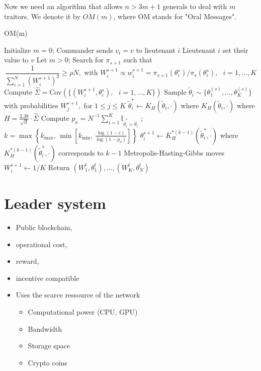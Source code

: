 Now we need an algorithm that allows $n>3m+1$ generals to deal with $m$ traitors. We denote it by $OM(m)$, where OM stands for "Oral Messages".
\begin{algorithm}[!ht]
\caption{OM(m) }\label{alg:om}
\begin{algorithmic}[1]
\State Initialize $m=0$;
\State Commander sends $v_i = v$ to lieutenant $i$ 
\State Lieutenant $i$ set their value to $v$
\EndFor
\State Let $m>0$;
\State Search for $\pi_{s+1}$ such that
\[
\frac{1}{\sum_{i=1}^{N}(W_i^{s+1})^2}\geq \rho N,\text{ with }W_i^{s+1}\propto w_i^{s+1} = \pi_{s+1}(\theta^{s}_i)/\pi_{s}(\theta^{s}_i) ,\text{ }i = 1,\ldots, K
\]
\State Compute $\widehat{\Sigma} = \text{Cov}\left(\{ (W_i^{s+1}, \theta_i^{s}),\text{ }i = 1,\ldots, K\}\right)$
\State Sample $\tilde{\theta}_i\sim\{\theta^{(s)}_1,\ldots, \theta^{(s)}_K\}$ with probabilities $W_j^{s+1},\text{ for }1\leq j\leq K$
\EndFor 
{}
\State $\tilde{\theta}^\ast_i\leftarrow K_H(\tilde{\theta}_i,\cdot)$ where $K_H(\tilde{\theta}_i,\cdot)$ where $H = \frac{2.38}{\sqrt{d}}\cdot \widehat{\Sigma}$ 
\EndFor 
\State Compute $p_a = N^{-1}\sum_{i = 1}^K\mathbb{I}_{\tilde{\theta}^\ast_i=\tilde{\theta}_i}$ ; $k = \max\left\{k_{\text{max}},\, \min\left[k_{\text{min}},\,\frac{\log(1-c)}{\log(1-p_a)}\right]\right\}$
\State $\theta^{s+1}_i\leftarrow K_H^{\ast (k-1)}(\tilde{\theta}^\ast_i,\cdot)$ where $K_H^{\ast (k-1)}(\tilde{\theta}^\ast_i,\cdot)$ corresponds to $k-1$ Metropolis-Hasting-Gibbs moves
\State $W_i^{s+1}\leftarrow 1/K$
\EndFor
\EndWhile
\State Return $(W^{t}_1,\theta^{t}_1),\ldots, (W^{t}_K,\theta^{t}_N)$
\end{algorithmic}
\end{algorithm}



\section{Leader system}\label{sec:leader}
\begin{itemize}
\item Public blockchain, 
\item operational cost, 
\item reward, 
\item incentive compatible
\item Uses the scarce ressource of the network
\begin{itemize}
	\item Computational power (CPU, GPU)
	\item Bandwidth
	\item Storage space
	\item Crypto coins
\end{itemize}
\end{itemize}
